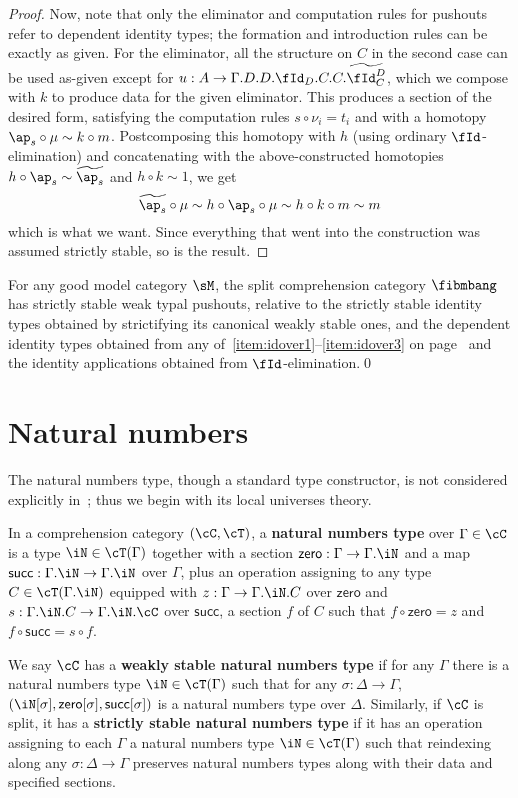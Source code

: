 \documentclass{amsart}
\let\N\iN
\let\C\cC
\let\T\cT
\def\zero{\mathsf{zero}}
\def\succ{\mathsf{succ}}
\let\Id\fId
\newcommand{\Idtwo}[2]{\widetilde{\Id^{#1}_{#2}}}
\newcommand{\aptwo}[1]{\widetilde{\ap_{#1}}}
\begin{document}
\begin{proof}
  Now, note that only the eliminator and computation rules for pushouts refer to dependent identity types; the formation and introduction rules can be exactly as given.
  For the eliminator, all the structure on $C$ in the second case can be used as-given except for $u:A\to \Gamma.D.D.\Id_D.C.C.\Idtwo{D}{C}$, which we compose with $k$ to produce data for the given eliminator.
  This produces a section of the desired form, satisfying the computation rules $s\circ \nu_i = t_i$ and with a homotopy $\ap_s\circ \mu \sim k\circ m$.
  Postcomposing this homotopy with $h$ (using ordinary $\Id$-elimination) and concatenating with the above-constructed homotopies $h\circ \ap_s \sim \aptwo{s}$ and $h\circ k \sim 1$, we get
  \[ \aptwo{s} \circ \mu \sim h\circ \ap_s \circ \mu \sim h\circ k\circ m \sim m \]
  which is what we want.
  Since everything that went into the construction was assumed strictly stable, so is the result.
\end{proof}

\begin{cor}
  For any good model category $\sM$, the split comprehension category $\fibmbang$ has strictly stable weak typal pushouts, relative to the strictly stable identity types obtained by strictifying its canonical weakly stable ones, and the dependent identity types obtained from any of~\ref{item:idover1}--\ref{item:idover3} on page~\pageref{idover} and the identity applications obtained from $\Id$-elimination.\qed
\end{cor}

\section{Natural numbers}
\label{sec:natural-numbers}

The natural numbers type, though a standard type constructor, is not considered explicitly in~\cite{lw:localuniv}; thus we begin with its local universes theory.

\begin{defn}
  In a comprehension category $(\C,\T)$, a \textbf{natural numbers type} over $\Gamma\in\C$ is a type $\N\in\T(\Gamma)$ together with a section $\zero:\Gamma\to\Gamma.\N$ and a map $\succ:\Gamma.\N\to\Gamma.\N$ over $\Gamma$, plus an operation assigning to any type $C\in\T(\Gamma.\N)$ equipped with $z:\Gamma\to\Gamma.\N.C$ over $\zero$ and $s:\Gamma.\N.C \to \Gamma.\N.\C$ over $\succ$, a section $f$ of $C$ such that $f \circ \zero = z$ and $f\circ \succ = s \circ f$.

  We say $\C$ has a \textbf{weakly stable natural numbers type} if for any $\Gamma$ there is a natural numbers type $\N\in\T(\Gamma)$ such that for any $\sigma:\Delta\to\Gamma$, $(\N[\sigma],\zero[\sigma],\succ[\sigma])$ is a natural numbers type over $\Delta$.
  Similarly, if $\C$ is split, it has a \textbf{strictly stable natural numbers type} if it has an operation assigning to each $\Gamma$ a natural numbers type $\N\in\T(\Gamma)$ such that reindexing along any $\sigma:\Delta\to\Gamma$ preserves natural numbers types along with their data and specified sections.
\end{defn}
\end{document}
